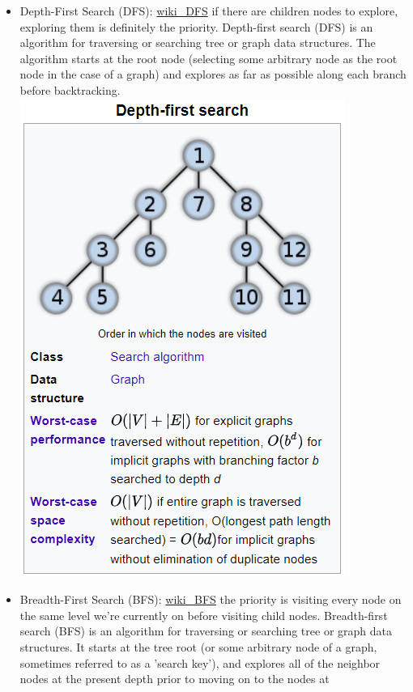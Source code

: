 \documentclass[11pt]{article}
\makeatletter
\def\maxwidth{\ifdim\Gin@nat@width>\linewidth\linewidth
    \else\Gin@nat@width\fi}
\let\Oldincludegraphics\includegraphics
\renewcommand{\includegraphics}[1]{\Oldincludegraphics[width=.8\maxwidth]{#1}}
\makeatother
\begin{document}
\begin{itemize}
\item
  Depth-First Search (DFS):
  \href{https://en.wikipedia.org/wiki/Depth-first_search}{wiki\_DFS} if
  there are children nodes to explore, exploring them is definitely the
  priority. Depth-first search (DFS) is an algorithm for traversing or
  searching tree or graph data structures. The algorithm starts at the
  root node (selecting some arbitrary node as the root node in the case
  of a graph) and explores as far as possible along each branch before
  backtracking. \includegraphics{source/lesson6_binarytree_DFS.png}
\item
  Breadth-First Search (BFS):
  \href{https://en.wikipedia.org/wiki/Breadth-first_search}{wiki\_BFS}
  the priority is visiting every node on the same level we're currently
  on before visiting child nodes. Breadth-first search (BFS) is an
  algorithm for traversing or searching tree or graph data structures.
  It starts at the tree root (or some arbitrary node of a graph,
  sometimes referred to as a 'search key'), and explores all of the
  neighbor nodes at the present depth prior to moving on to the nodes at

\end{itemize}
\end{document}
